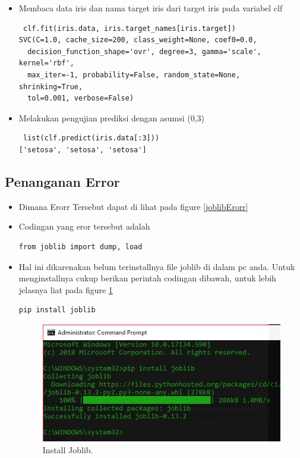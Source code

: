 \begin{enumerate}
\begin{itemize}
\item Membaca data iris dan nama target iris dari target iris pada variabel clf
\begin{verbatim}
 clf.fit(iris.data, iris.target_names[iris.target])  
SVC(C=1.0, cache_size=200, class_weight=None, coef0=0.0,
  decision_function_shape='ovr', degree=3, gamma='scale', kernel='rbf',
  max_iter=-1, probability=False, random_state=None, shrinking=True,
  tol=0.001, verbose=False)
\end{verbatim}

\item Melakukan pengujian prediksi dengan asumsi (0,3)
\begin{verbatim}
 list(clf.predict(iris.data[:3]))  
['setosa', 'setosa', 'setosa']
\end{verbatim}
\end{itemize}

\subsection{Penanganan Error}
\begin{itemize}
\item
Dimana Erorr Tersebut dapat di lihat pada figure \ref{joblibErorr}



\item
Codingan yang eror tersebut adalah
\begin{verbatim}
from joblib import dump, load
\end{verbatim}

\item
Hal ini dikarenakan belum terinstallnya file joblib di dalam pc anda. Untuk menginstallnya cukup berikan perintah codingan dibawah, untuk lebih jelasnya liat pada figure \ref{installjb}
\begin{verbatim}
pip install joblib
\end{verbatim}

\begin{figure}[ht]
\centerline{\includegraphics[width=1\textwidth]{figures/YN2.PNG}}
\caption{Install Joblib.}
\label{installjb}
\end{figure}


\end{itemize}
\end{enumerate}
